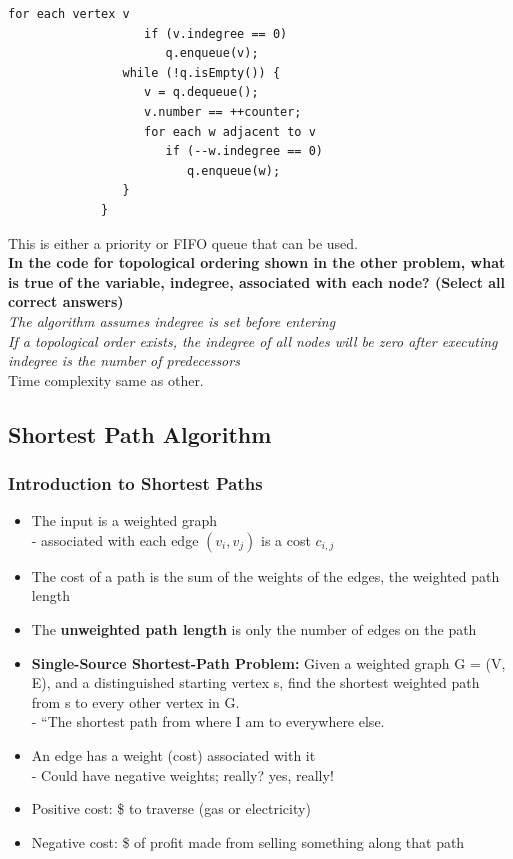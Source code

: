 \documentclass[10pt]{article}
\begin{document}
\begin{itemize}
\begin{lstlisting}[style=java]
                for each vertex v
                   if (v.indegree == 0)
                      q.enqueue(v);
                while (!q.isEmpty()) {
                   v = q.dequeue();
                   v.number == ++counter;
                   for each w adjacent to v
                      if (--w.indegree == 0)
                         q.enqueue(w);
                }
             }
                    \end{lstlisting}
          This is either a priority or FIFO queue that can be used.\\
          \textbf{In the code for topological ordering shown in the other problem, what is true of the variable, indegree, associated with each node?  (Select all correct answers)
          }\\\textit{The algorithm assumes indegree is set before entering}\\\textit{If a topological order exists, the indegree of all nodes will be zero after executing}\\\textit{indegree is the number of predecessors}\\Time complexity same as other.
\end{itemize}

\subsection{Shortest Path Algorithm}
\subsubsection{Introduction to Shortest Paths}
\begin{itemize}
    \item The input is a weighted graph \\- associated with each edge $(v_i, v_j)$ is a cost $c_{i,j}$
    \item The cost of a path is the sum of the weights of the edges, the weighted path length
    \item The \textbf{unweighted path length} is only the number of edges on the path
    \item \textbf{Single-Source Shortest-Path Problem:} Given a weighted graph G = (V, E), and a distinguished starting vertex s, find the shortest weighted path from s to every other vertex in G. \\- “The shortest path from where I am to everywhere else.
    \item An edge has a weight (cost) associated with it \\- Could have negative weights; really? yes, really!
    \item Positive cost: \$ to traverse (gas or electricity)
    \item Negative cost: \$ of profit made from selling something along that path
\end{itemize}
\end{document}
